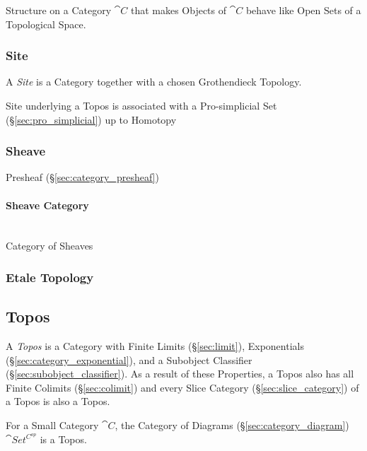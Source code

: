 Structure on a Category $\cat{C}$ that makes Objects of
$\cat{C}$ behave like Open Sets of a Topological Space.



\subsubsection{Site}\label{sec:site}

A \emph{Site} is a Category together with a chosen Grothendieck
Topology.

Site underlying a Topos is associated with a Pro-simplicial Set
(\S\ref{sec:pro_simplicial}) up to Homotopy



\subsubsection{Sheave}\label{sec:sheave}

Presheaf (\S\ref{sec:category_presheaf})



\paragraph{Sheave Category}\label{sec:sheave_category}
\hfill \\

Category of Sheaves



\subsubsection{Etale Topology}\label{sec:etale_topology}



\subsection{Topos}\label{sec:topos}

A \emph{Topos} is a Category with Finite Limits (\S\ref{sec:limit}),
Exponentials (\S\ref{sec:category_exponential}), and a Subobject
Classifier (\S\ref{sec:subobject_classifier}). As a result of these
Properties, a Topos also has all Finite Colimits (\S\ref{sec:colimit})
and every Slice Category (\S\ref{sec:slice_category}) of a Topos is
also a Topos.

For a Small Category $\cat{C}$, the Category of Diagrams
(\S\ref{sec:category_diagram}) $\cat{Set^{C^{op}}}$ is a
Topos.\cite{awodey06}

